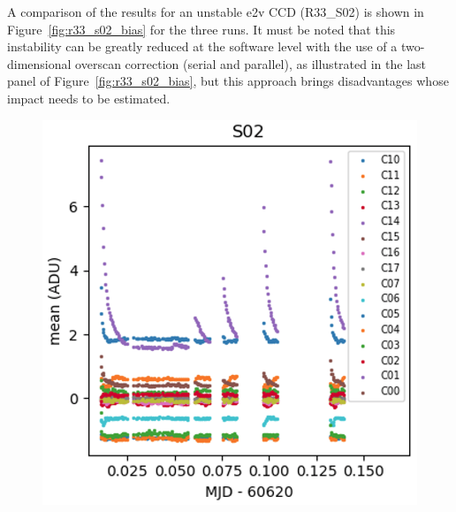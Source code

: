 A comparison of the results for an unstable e2v CCD (R33\_S02) is shown in Figure~\ref{fig:r33_s02_bias} for the
three runs. It must be noted that this instability can be greatly reduced at the software level with the use of a two-dimensional overscan correction (serial and parallel), as illustrated in 
the last panel of Figure~\ref{fig:r33_s02_bias}, but this approach brings disadvantages whose impact needs to be estimated.

\begin{figure}[htbp]
\centering
\begin{minipage}[b]{0.45\textwidth}
    \centering
    \includegraphics[width=\textwidth]{figures/E2136_R33_S02.png}
\end{minipage}
\hspace{0.05\textwidth}
\begin{minipage}[b]{0.45\textwidth}
    \centering

\end{minipage}
\end{figure}

